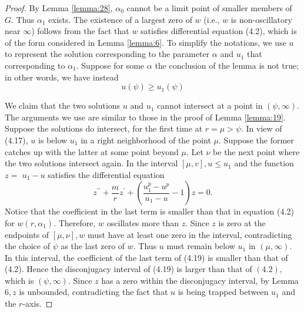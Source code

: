 \begin{proof}
  By Lemma \ref{lemma:28}, $\alpha_0$ cannot be a limit point of smaller members of $G$. Thus $\alpha_1$ exists. The existence of a largest zero of $w$ (i.e., $w$ is non-oscillatory near $\infty$) follows from the fact that $w$ satisfies differential equation (4.2), which is of the form considered in Lemma \ref{lemma:6}. To simplify the notations, we use $u$ to represent the solution corresponding to the parameter $\alpha$ and $u_1$ that corresponding to $\alpha_1$. Suppose for some $\alpha$ the conclusion of the lemma is not true; in other words, we have instead
  \begin{equation}\label{eq:4.17}
    u(\psi) \geq u_1(\psi)
  \end{equation}

  We claim that the two solutions $u$ and $u_1$ cannot intersect at a point 
  in $(\psi, \infty)$. The arguments we use are similar to those in the proof of Lemma \ref{lemma:19}. 
  Suppose the solutions do intersect, for the first time at $r=\mu>\psi$.
  In view of (4.17), $u$ is below $u_1$ in a right neighborhood of the point $\mu$.
  Suppose the former catches up with the latter at some point beyond $\mu$.
  Let $\nu$ be the next point where the two solutions intersect again.
  In the interval $[\mu, v], u \leq u_1$ and the function $z=$ $u_1-u$ satisfies the 
  differential equation
  \begin{equation}\label{eq:4.18}
    z^{\prime \prime}+\frac{m}{r} z^{\prime}+\left(\frac{u_1^p-u^p}{u_1-u}-1\right) z=0.
  \end{equation}
  Notice that the coefficient in the last term is smaller than that in equation (4.2) for $w\left(r, \alpha_1\right)$. Therefore, $w$ oscillates more than $z$. Since $z$ is zero at the endpoints of $[\mu, \nu], w$ must have at least one zero in the interval, contradicting the choice of $\psi$ as the last zero of $w$. Thus $u$ must remain below $u_1$ in $(\mu, \infty)$. In this interval, the coefficient of the last term of (4.19) is smaller than that of (4.2). Hence the disconjugacy interval of (4.19) is larger than that of $(4.2)$, which is $(\psi, \infty)$. Since $z$ has a zero within the disconjugacy interval, by Lemma $6, z$ is unbounded, contradicting the fact that $u$ is being trapped between $u_1$ and the $r$-axis.


\end{proof}
